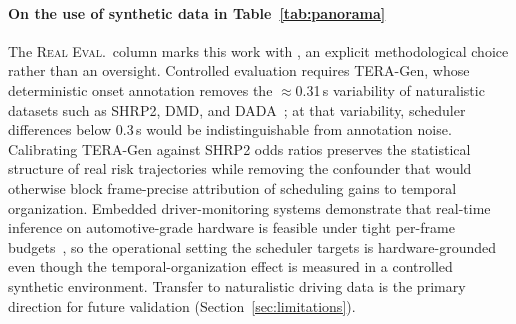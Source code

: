 \documentclass[a4paper,fleqn]{cas-dc}
\newcommand{\TERAGen}{\mbox{TERA-Gen}\xspace}
\begin{document}
\paragraph{On the use of synthetic data in Table~\ref{tab:panorama}}
The \textsc{Real Eval.}\ column marks this work with , an explicit
methodological choice rather than an oversight. Controlled evaluation requires
\TERAGen, whose deterministic onset annotation removes the $\approx$0.31\,s
variability of naturalistic datasets such as SHRP2, DMD, and
DADA~\cite{dingus2016shrp2,ortega2020dmd,fang2022dada}; at that variability,
scheduler differences below 0.3\,s would be indistinguishable from annotation
noise. Calibrating \TERAGen against SHRP2 odds ratios preserves the statistical
structure of real risk trajectories while removing the confounder that would
otherwise block frame-precise attribution of scheduling gains to temporal
organization. Embedded driver-monitoring systems demonstrate that real-time
inference on automotive-grade hardware is feasible under tight per-frame
budgets~\cite{hariharan2023driveredge,tinydl2025driverstate}, so the
operational setting the scheduler targets is hardware-grounded even though the
temporal-organization effect is measured in a controlled synthetic environment.
Transfer to naturalistic driving data is the
primary direction for future validation (Section~\ref{sec:limitations}).
\end{document}
